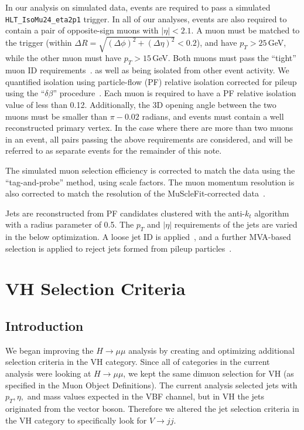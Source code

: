 \documentclass[12pt]{article}
\begin{document}
In our analysis on simulated data, events are required to pass a simulated \texttt{HLT\_IsoMu24\_eta2p1} trigger.
In all of our analyses, events are also required to contain a pair of opposite-sign muons with $|\eta|<2.1$.
A muon must be matched to the trigger (within $\Delta R = \sqrt{(\Delta \phi)^2+(\Delta \eta)^2}< 0.2$), 
and have $p_T>25$\,GeV, while the other muon must have $p_T>15$\,GeV.
Both muons must pass the ``tight'' muon ID requirements~\cite{AN2012_459}.
as well as being isolated from other event activity.  We quantified isolation using
particle-flow (PF) relative isolation corrected for pileup using the ``$\delta \beta$''
procedure~\cite{AN2012_459}.  Each muon is required to have a PF relative isolation value
of less than 0.12.  Additionally, the 3D opening angle between the two muons must be
smaller than $\pi-0.02$ radians, and events must contain a well reconstructed primary
vertex.
In the case where there are more than two muons in an event, all pairs passing the above
requirements are considered, and will be referred to as separate events for the remainder
of this note.  

The simulated muon selection efficiency is corrected to match the data using 
the ``tag-and-probe'' method, using scale factors.  The muon momentum resolution
is also corrected to match the resolution of the MuScleFit-corrected data~\cite{AN2012_459}.

Jets are reconstructed from PF candidates clustered with the anti-$k_t$ algorithm with
a radius parameter of 0.5.  The $p_T$ and $|\eta|$ requirements of the jets are varied in
the below optimization.  A loose jet ID is applied~\cite{AN2012_459}, and a further
MVA-based selection is applied to reject jets formed from pileup particles~\cite{PUID}.

\section{VH Selection Criteria}

\subsection{Introduction}

We began improving the $H \rightarrow \mu \mu$ analysis by creating and optimizing additional selection criteria in the VH category. 
Since all of categories in the current analysis were looking at $H \rightarrow \mu \mu$, we kept the same dimuon 
selection for VH (as specified in the Muon Object Definitions). 
The current analysis selected jets with $p_{T}, \eta,$ and mass values expected in the VBF channel, but in VH the jets originated from the vector boson. 
Therefore we altered the jet selection criteria in the VH category to specifically look for $V \rightarrow jj$.
\end{document}
